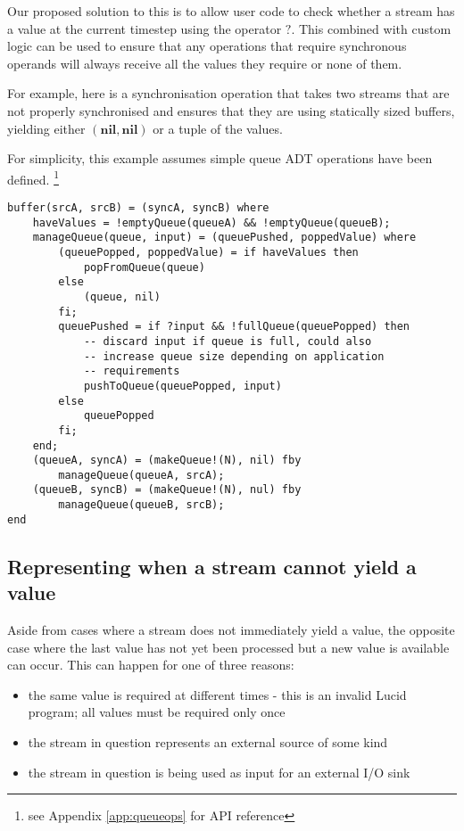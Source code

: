 \documentclass{scrartcl}
\begin{document}
    Our proposed solution to this is to allow user code to check whether a stream has a value at the current timestep using the operator $?$. This combined with custom logic can be used to ensure that any operations that require synchronous operands will always receive all the values they require or none of them.
    
    For example, here is a synchronisation operation that takes two streams that are not properly synchronised and ensures that they are using statically sized buffers, yielding either $(\textbf{nil}, \textbf{nil})$ or a tuple of the values.
    
    For simplicity, this example assumes simple queue ADT operations have been defined.
    \footnote{see Appendix \ref{app:queueops} for API reference}
    
    \begin{lstlisting}
buffer(srcA, srcB) = (syncA, syncB) where
    haveValues = !emptyQueue(queueA) && !emptyQueue(queueB);
    manageQueue(queue, input) = (queuePushed, poppedValue) where
        (queuePopped, poppedValue) = if haveValues then
            popFromQueue(queue)
        else
            (queue, nil)
        fi;
        queuePushed = if ?input && !fullQueue(queuePopped) then
            -- discard input if queue is full, could also
            -- increase queue size depending on application
            -- requirements
            pushToQueue(queuePopped, input)
        else
            queuePopped
        fi;
    end;
    (queueA, syncA) = (makeQueue!(N), nil) fby
        manageQueue(queueA, srcA);
    (queueB, syncB) = (makeQueue!(N), nul) fby
        manageQueue(queueB, srcB);
end
    \end{lstlisting}
        
    \subsection{Representing when a stream cannot yield a value}
    
    Aside from cases where a stream does not immediately yield a value, the opposite case where the last value has not yet been processed but a new value is available can occur. This can happen for one of three reasons:
    \begin{itemize}
        \item the same value is required at different times - this is an invalid Lucid program; all values must be required only once
        \item the stream in question represents an external source of some kind
        \item the stream in question is being used as input for an external I/O sink
    \end{itemize}
    
\end{document}
